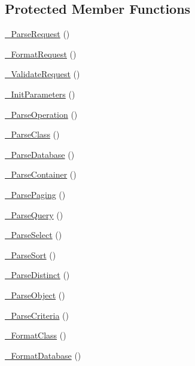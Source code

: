 \subsection*{Protected Member Functions}
\begin{DoxyCompactItemize}
\item 
\hyperlink{class_c_data_wrapper_a8b42bd195d9ec6b38ef8e0df3f5dba7a}{\-\_\-\-Parse\-Request} ()
\item 
\hyperlink{class_c_data_wrapper_ab46c0e9797e8636ca1c9d535b377b90a}{\-\_\-\-Format\-Request} ()
\item 
\hyperlink{class_c_data_wrapper_aed059c9ffcb6e988633ba5b28a875b76}{\-\_\-\-Validate\-Request} ()
\item 
\hyperlink{class_c_data_wrapper_ad6d3a6b104fc3aa831cabb3271e096da}{\-\_\-\-Init\-Parameters} ()
\item 
\hyperlink{class_c_data_wrapper_a5f5f4beb1e2362c9166cf9aeb687ebc2}{\-\_\-\-Parse\-Operation} ()
\item 
\hyperlink{class_c_data_wrapper_a5bbe50542668dc7fddb133ad4ae5a839}{\-\_\-\-Parse\-Class} ()
\item 
\hyperlink{class_c_data_wrapper_afdf0880393aff6f06b29a03245bed4a5}{\-\_\-\-Parse\-Database} ()
\item 
\hyperlink{class_c_data_wrapper_a7f0f78bd3a8528562275fb6cbb2f161d}{\-\_\-\-Parse\-Container} ()
\item 
\hyperlink{class_c_data_wrapper_a3a0153df5d8c9e29e53d5060b78de785}{\-\_\-\-Parse\-Paging} ()
\item 
\hyperlink{class_c_data_wrapper_a3b0852a34c7e36ae691fa6afdfe78856}{\-\_\-\-Parse\-Query} ()
\item 
\hyperlink{class_c_data_wrapper_abf0dba3c1610c5292dd475e53e757891}{\-\_\-\-Parse\-Select} ()
\item 
\hyperlink{class_c_data_wrapper_a73cd0698e6eb033bf5500be06d3c9814}{\-\_\-\-Parse\-Sort} ()
\item 
\hyperlink{class_c_data_wrapper_a8090c59cd0c69102a8ff20a1098da31d}{\-\_\-\-Parse\-Distinct} ()
\item 
\hyperlink{class_c_data_wrapper_ab8f321158c05c2db991c35fa43b7b652}{\-\_\-\-Parse\-Object} ()
\item 
\hyperlink{class_c_data_wrapper_a1d5c10df99994e42e3b80db49276f70f}{\-\_\-\-Parse\-Criteria} ()
\item 
\hyperlink{class_c_data_wrapper_a9fc9b3bd064cfaa58920fcbfa8178abc}{\-\_\-\-Format\-Class} ()
\item 
\hyperlink{class_c_data_wrapper_a2fd22a1e55d94b6d9b65f8c56496cd3b}{\-\_\-\-Format\-Database} ()

\end{DoxyCompactItemize}
